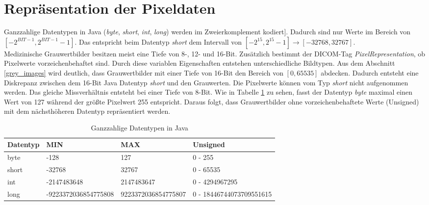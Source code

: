 \section{Repräsentation der Pixeldaten}

Ganzzahlige Datentypen in Java (\textit{byte}, \textit{short}, \textit{int}, \textit{long}) werden im Zweierkomplement kodiert\cite[S.106]{java:insel}]. Dadurch sind nur Werte im Bereich von $[-2^{BIT-1}, 2^{BIT-1}-1]$. Das entspricht beim Datentyp \textit{short} dem Intervall von $[-2^{15}, 2^{15}-1] \rightarrow [-32768, 32767]$.\\
Medizinische Grauwertbilder besitzen meist eine Tiefe von 8-, 12- und 16-Bit. Zusätzlich bestimmt der DICOM-Tag \textit{PixelRepresentation}, ob Pixelwerte vorzeichenbehaftet sind. Durch diese variablen Eigenschaften entstehen unterschiedliche Bildtypen. Aus dem Abschnitt \ref{grey_images} wird deutlich, dass Grauwertbilder mit einer Tiefe von 16-Bit den Bereich von $[0,65535]$ abdecken. Dadurch entsteht eine Diskrepanz zwischen dem 16-Bit Java Datentyp \textit{short} und den Grauwerten. Die Pixelwerte können vom Typ \textit{short} nicht aufgenommen werden. Das gleiche Missverhältnis entsteht bei einer Tiefe von 8-Bit. Wie in Tabelle \ref{java:datentypen} zu sehen, fasst der Datentyp \textit{byte} maximal einen Wert von 127 während der größte Pixelwert 255 entspricht. Daraus folgt, dass Grauwertbilder ohne vorzeichenbehaftete Werte (Unsigned) mit dem nächsthöheren Datentyp repräsentiert werden.

\begin{table}
    \begin{tabularx}{\textwidth}{|X|X|X|X|}
    \toprule
    \hline
    \textbf{Datentyp}         & \textbf{MIN}    & \textbf{MAX}& \textbf{Unsigned} \\ \hline
    byte 		 			  & -128					& 127 		  & 0 - 255\\ \hline
    short 		 			  & -32768				& 32767 		  	  & 	0 - 65535\\ \hline
    int						  & -2147483648		& 2147483647 		  & 0 - 4294967295\\ \hline
    long 				      & \tiny{-9223372036854775808}			& \tiny{9223372036854775807} 		  & \tiny{0 - 18446744073709551615}\\ \hline

    \bottomrule
    \end{tabularx}
    \caption {Ganzzahlige Datentypen in Java}
    \label{java:datentypen}
\end{table}

